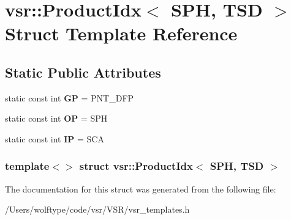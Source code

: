 \hypertarget{structvsr_1_1_product_idx_3_01_s_p_h_00_01_t_s_d_01_4}{\section{vsr\-:\-:Product\-Idx$<$ S\-P\-H, T\-S\-D $>$ Struct Template Reference}
\label{structvsr_1_1_product_idx_3_01_s_p_h_00_01_t_s_d_01_4}
}
\subsection*{Static Public Attributes}
\begin{DoxyCompactItemize}
\item 
\hypertarget{structvsr_1_1_product_idx_3_01_s_p_h_00_01_t_s_d_01_4_a6297dd5b352fd3918d860c1b217debb7}{static const int {\bfseries G\-P} = P\-N\-T\-\_\-\-D\-F\-P}\label{structvsr_1_1_product_idx_3_01_s_p_h_00_01_t_s_d_01_4_a6297dd5b352fd3918d860c1b217debb7}

\item 
\hypertarget{structvsr_1_1_product_idx_3_01_s_p_h_00_01_t_s_d_01_4_a75bad80f89fd0ec8c3d231b3d19d3d1e}{static const int {\bfseries O\-P} = S\-P\-H}\label{structvsr_1_1_product_idx_3_01_s_p_h_00_01_t_s_d_01_4_a75bad80f89fd0ec8c3d231b3d19d3d1e}

\item 
\hypertarget{structvsr_1_1_product_idx_3_01_s_p_h_00_01_t_s_d_01_4_a31306a1e88bb234ddcc6dbd0c6f7a01e}{static const int {\bfseries I\-P} = S\-C\-A}\label{structvsr_1_1_product_idx_3_01_s_p_h_00_01_t_s_d_01_4_a31306a1e88bb234ddcc6dbd0c6f7a01e}

\end{DoxyCompactItemize}
\subsubsection*{template$<$$>$ struct vsr\-::\-Product\-Idx$<$ S\-P\-H, T\-S\-D $>$}



The documentation for this struct was generated from the following file\-:\begin{DoxyCompactItemize}
\item 
/\-Users/wolftype/code/vsr/\-V\-S\-R/vsr\-\_\-templates.\-h\end{DoxyCompactItemize}
